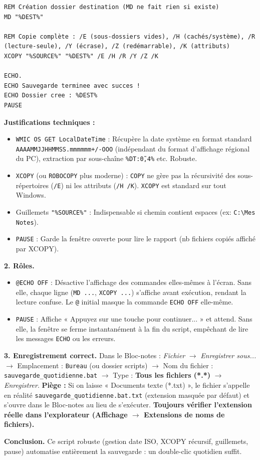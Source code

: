 \documentclass[11pt]{article}
\begin{document}
\begin{exoresolu}
\begin{lstlisting}
REM Création dossier destination (MD ne fait rien si existe)
MD "%DEST%"

REM Copie complète : /E (sous-dossiers vides), /H (cachés/système), /R (lecture-seule), /Y (écrase), /Z (redémarrable), /K (attributs)
XCOPY "%SOURCE%" "%DEST%" /E /H /R /Y /Z /K

ECHO.
ECHO Sauvegarde terminee avec succes !
ECHO Dossier cree : %DEST%
PAUSE
\end{lstlisting}

\textbf{Justifications techniques :}
\begin{itemize}
  \item \texttt{WMIC OS GET LocalDateTime} : Récupère la date système en format standard \texttt{AAAAMMJJHHMMSS.mmmmmm+/-OOO} (indépendant du format d'affichage régional du PC), extraction par sous-chaîne \texttt{\%DT:\~0,4\%} etc. Robuste.
  \item \texttt{XCOPY} (ou \texttt{ROBOCOPY} plus moderne) : \texttt{COPY} ne gère pas la récursivité des sous-répertoires (\texttt{/E}) ni les attributs (\texttt{/H /K}). \texttt{XCOPY} est standard sur tout Windows.
  \item Guillemets \texttt{"\%SOURCE\%"} : Indispensable si chemin contient espaces (ex: \texttt{C:\textbackslash Mes Notes}).
  \item \texttt{PAUSE} : Garde la fenêtre ouverte pour lire le rapport (nb fichiers copiés affiché par XCOPY).
\end{itemize}

\textbf{2. Rôles.}
\begin{itemize}
  \item \texttt{@ECHO OFF} : Désactive l'affichage des commandes elles-mêmes à l'écran. Sans elle, chaque ligne (\texttt{MD ...}, \texttt{XCOPY ...}) s'affiche avant exécution, rendant la lecture confuse. Le \texttt{@} initial masque la commande \texttt{ECHO OFF} elle-même.
  \item \texttt{PAUSE} : Affiche « Appuyez sur une touche pour continuer... » et attend. Sans elle, la fenêtre se ferme instantanément à la fin du script, empêchant de lire les messages \texttt{ECHO} ou les erreurs.
\end{itemize}

\textbf{3. Enregistrement correct.} Dans le Bloc-notes : \emph{Fichier} $\rightarrow$ \emph{Enregistrer sous...} $\rightarrow$ Emplacement : \texttt{Bureau} (ou dossier scripts) $\rightarrow$ Nom du fichier : \texttt{sauvegarde\_quotidienne.bat} $\rightarrow$ Type : \textbf{Tous les fichiers (*.*)} $\rightarrow$ \emph{Enregistrer}.
\textbf{Piège :} Si on laisse « Documents texte (*.txt) », le fichier s'appelle en réalité \texttt{sauvegarde\_quotidienne.bat.txt} (extension masquée par défaut) et s'ouvre dans le Bloc-notes au lieu de s'exécuter. \textbf{Toujours vérifier l'extension réelle dans l'explorateur (Affichage $\rightarrow$ Extensions de noms de fichiers).}

\textbf{Conclusion.} Ce script robuste (gestion date ISO, XCOPY récursif, guillemets, pause) automatise entièrement la sauvegarde : un double-clic quotidien suffit.
\end{exoresolu}
\end{document}

